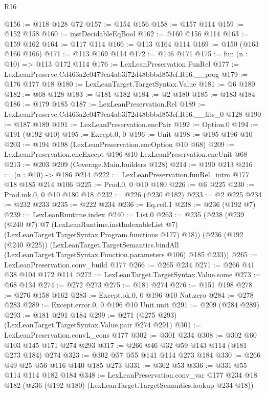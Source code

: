 \begin{lexlean}{R16}
\begin{coremodule}
@156 := @118 @128 @72
@157 := @154 @156
@158 := @157 @114
@159 := @152 @158
@160 := instDecidableEqBool
@162 := @160 @156 @114
@163 := @159 @162
@164 := @117 @114
@166 := @113 @164 @114
@169 := @150 (@163 @166 @166)
@171 := @113 @169 @114
@172 := @146 @171
@175 := fun (n : @10) => @113 @172 @114
@176 := LexLeanPreservation.FunRel
@177 := LexLeanPreserve.Cd463a2c0479ca4ab3f72d48bbbd853ef.R16.__prog
@179 := @176 @177 @18
@180 := LexLeanTarget.TargetSyntax.Value
@181 := @6 @180
@182 := @68 @128
@183 := @181 @182
@184 := @2 @180
@185 := @183 @184
@186 := @179 @185
@187 := LexLeanPreservation.Rel
@189 := LexLeanPreserve.Cd463a2c0479ca4ab3f72d48bbbd853ef.R16.__fits_0 @128
@190 := @187 @189
@191 := LexLeanPreservation.encPair
@192 := Option.{0}
@194 := @191 (@192 @10)
@195 := Except.{0, 0}
@196 := Unit
@198 := @195 @196 @10
@203 := @194 @198 (LexLeanPreservation.encOption @10 @68)
@209 := LexLeanPreservation.encExcept @196 @10 LexLeanPreservation.encUnit @68
@213 := @203 @209 (Coverage.Main.builders @128)
@214 := @190 @213
@216 := (n : @10) -> @186 @214
@222 := LexLeanPreservation.funRel_intro @177 @18 @185 @214 @106
@225 := Prod.{0, 0} @10 @180
@226 := @6 @225
@230 := Prod.mk.{0, 0} @10 @180 @18
@232 := @226 (@230 @182)
@233 := @2 @225
@234 := @232 @233
@235 := @222 @234
@236 := Eq.refl.{1}
@238 := @236 (@192 @7)
@239 := LexLeanRuntime.index
@240 := List.{0}
@263 := @235
    (@238
      (@239
        (@240 @7)
        @7
        (LexLeanRuntime.instIndexableList @7)
        (LexLeanTarget.TargetSyntax.Program.functions @177)
        @18))
    (@236
      (@192 (@240 @225))
      (LexLeanTarget.TargetSemantics.bindAll
        (LexLeanTarget.TargetSyntax.Function.parameters @106)
        @185
        @233))
@265 := LexLeanPreservation.conv_build @177
@266 := @265 @234
@271 := @266 @41 @38 @104 @172 @114
@272 := LexLeanTarget.TargetSyntax.Value.some
@273 := @68 @134
@274 := @272 @273
@275 := @181 @274
@276 := @151 @198
@278 := @276 @158 @162
@283 := Except.ok.{0, 0} @196 @10 Nat.zero
@284 := @278 @283
@289 := Except.error.{0, 0} @196 @10 Unit.unit
@291 := @209 (@284 @289)
@293 := @181 @291 @184
@299 := @271 (@275 @293) (LexLeanTarget.TargetSyntax.Value.pair @274 @291)
@301 := LexLeanPreservation.convL_cons @177
@302 := @301 @234
@308 := @302 @60 @103 @145 @171 @274 @293
@317 := @266 @46 @32 @59 @143 @114 (@181 @273 @184) @274
@323 := @302 @57 @55 @141 @114 @273 @184
@330 := @266 @49 @25 @56 @116 @140 @185 @273
@331 := @302 @53
@336 := @331 @55 @114 @114 @182 @184
@348 := LexLeanPreservation.conv_var
    @177
    @234
    @18
    @182
    (@236 (@192 @180) (LexLeanTarget.TargetSemantics.lookup @234 @18))

\end{coremodule}
\end{lexlean}
